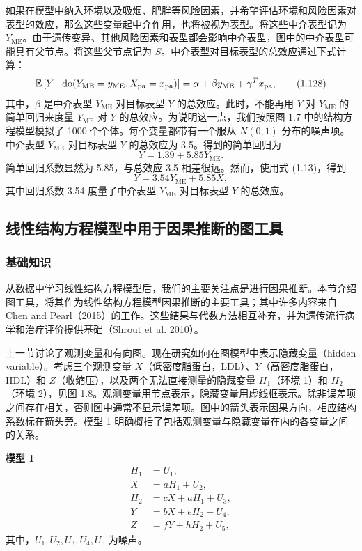 如果在模型中纳入环境以及吸烟、肥胖等风险因素，并希望评估环境和风险因素对表型的效应，那么这些变量起中介作用，也将被视为表型。将这些中介表型记为 $Y_{\mathrm{ME}}$。由于遗传变异、其他风险因素和表型都会影响中介表型，图中的中介表型可能具有父节点。将这些父节点记为 $S$。中介表型对目标表型的总效应通过下式计算：
\begin{equation}
\mathbb{E}\left[Y\mid\mathrm{do}(Y_{\mathrm{ME}}=y_{\mathrm{ME}},X_{\mathrm{pa}}=x_{\mathrm{pa}})\right]
=\alpha+\beta y_{\mathrm{ME}}+\gamma^Tx_{\mathrm{pa}},
\tag{1.128}
\end{equation}
其中，$\beta$ 是中介表型 $Y_{\mathrm{ME}}$ 对目标表型 $Y$ 的总效应。此时，不能再用 $Y$ 对 $Y_{\mathrm{ME}}$ 的简单回归来度量 $Y_{\mathrm{ME}}$ 对 $Y$ 的总效应。为说明这一点，我们按照图 1.7 中的结构方程模型模拟了 1000 个个体。每个变量都带有一个服从 $N(0,1)$ 分布的噪声项。中介表型 $Y_{\mathrm{ME}}$ 对目标表型 $Y$ 的总效应为 3.5。得到的简单回归为
\[
Y=1.39+5.85Y_{\mathrm{ME}}.
\]
简单回归系数显然为 5.85，与总效应 3.5 相差很远。然而，使用式 (1.13)，得到
\[
Y=3.54Y_{\mathrm{ME}}+5.85X,
\]
其中回归系数 3.54 度量了中介表型 $Y_{\mathrm{ME}}$ 对目标表型 $Y$ 的总效应。


\FloatBarrier

\subsection{线性结构方程模型中用于因果推断的图工具}
\subsubsection{基础知识}

从数据中学习线性结构方程模型后，我们的主要关注点是进行因果推断。本节介绍图工具，将其作为线性结构方程模型因果推断的主要工具；其中许多内容来自 Chen and Pearl（2015）的工作。这些结果与代数方法相互补充，并为遗传流行病学和治疗评价提供基础（Shrout et al. 2010）。

上一节讨论了观测变量和有向图。现在研究如何在图模型中表示隐藏变量（hidden variable）。考虑三个观测变量 $X$（低密度脂蛋白，LDL）、$Y$（高密度脂蛋白，HDL）和 $Z$（收缩压），以及两个无法直接测量的隐藏变量 $H_1$（环境 1）和 $H_2$（环境 2），见图 1.8。观测变量用节点表示，隐藏变量用虚线框表示。除非误差项之间存在相关，否则图中通常不显示误差项。图中的箭头表示因果方向，相应结构系数标在箭头旁。模型 1 明确概括了包括观测变量与隐藏变量在内的各变量之间的关系。



\noindent\textbf{模型 1}
\[
\begin{aligned}
H_1&=U_1,\\
X&=aH_1+U_2,\\
H_2&=cX+aH_1+U_3,\\
Y&=bX+eH_2+U_4,\\
Z&=fY+hH_2+U_5,
\end{aligned}
\]
其中，$U_1,U_2,U_3,U_4,U_5$ 为噪声。


